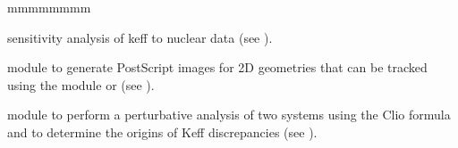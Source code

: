 \begin{ListeDeDescription}{mmmmmmmm}
\item[\moc{SENS:}] sensitivity analysis of keff to nuclear data (see ).

\item[\moc{PSP:}] module to generate PostScript images for 2D geometries that can be tracked using the module 
 or  (see ).

\item[\moc{DUO:}] module to perform a perturbative analysis of two systems using the Clio formula and to determine the origins
of Keff discrepancies (see ).

\end{ListeDeDescription}
